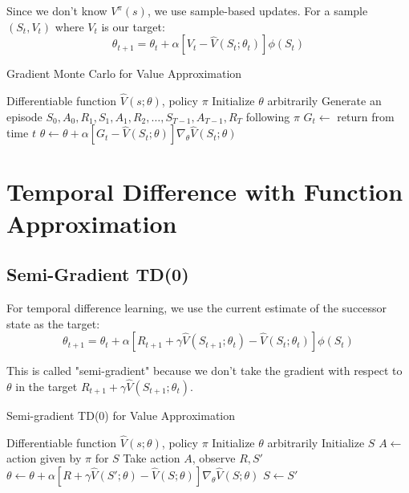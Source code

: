 Since we don't know $V^\pi(s)$, we use sample-based updates. For a sample $(S_t, V_t)$ where $V_t$ is our target:
\begin{equation}
\theta_{t+1} = \theta_t + \alpha \left[ V_t - \hat{V}(S_t; \theta_t) \right] \phi(S_t)
\end{equation}

\begin{algorithm}
\caption{Gradient Monte Carlo for Value Approximation}
\begin{algorithmic}
\REQUIRE Differentiable function $\hat{V}(s; \theta)$, policy $\pi$
\STATE Initialize $\theta$ arbitrarily
\REPEAT
    \STATE Generate an episode $S_0, A_0, R_1, S_1, A_1, R_2, \ldots, S_{T-1}, A_{T-1}, R_T$ following $\pi$
        \STATE $G_t \leftarrow$ return from time $t$
        \STATE $\theta \leftarrow \theta + \alpha [G_t - \hat{V}(S_t; \theta)] \nabla_\theta \hat{V}(S_t; \theta)$
    \ENDFOR
{}
\end{algorithmic}
\end{algorithm}

\section{Temporal Difference with Function Approximation}

\subsection{Semi-Gradient TD(0)}

For temporal difference learning, we use the current estimate of the successor state as the target:
\begin{equation}
\theta_{t+1} = \theta_t + \alpha \left[ R_{t+1} + \gamma \hat{V}(S_{t+1}; \theta_t) - \hat{V}(S_t; \theta_t) \right] \phi(S_t)
\end{equation}

This is called "semi-gradient" because we don't take the gradient with respect to $\theta$ in the target $R_{t+1} + \gamma \hat{V}(S_{t+1}; \theta_t)$.

\begin{algorithm}
\caption{Semi-gradient TD(0) for Value Approximation}
\begin{algorithmic}
\REQUIRE Differentiable function $\hat{V}(s; \theta)$, policy $\pi$
\STATE Initialize $\theta$ arbitrarily
\REPEAT
    \STATE Initialize $S$
    \REPEAT
        \STATE $A \leftarrow$ action given by $\pi$ for $S$
        \STATE Take action $A$, observe $R, S'$
        \STATE $\theta \leftarrow \theta + \alpha [R + \gamma \hat{V}(S'; \theta) - \hat{V}(S; \theta)] \nabla_\theta \hat{V}(S; \theta)$
        \STATE $S \leftarrow S'$
\end{algorithmic}
\end{algorithm}

